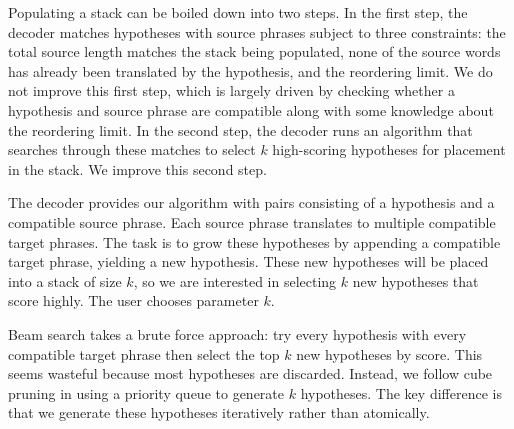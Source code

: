 \documentclass[11pt]{article}
\begin{document}
Populating a stack can be boiled down into two steps.  In the first step, the decoder matches hypotheses with source phrases subject to three constraints: the total source length matches the stack being populated, none of the source words has already been translated by the hypothesis, and the reordering limit.  We do not improve this first step, which is largely driven by checking whether a hypothesis and source phrase are compatible along with some knowledge about the reordering limit.  In the second step, the decoder runs an algorithm that searches through these matches to select $k$ high-scoring hypotheses for placement in the stack.  We improve this second step.   


The decoder provides our algorithm with pairs consisting of a hypothesis and a compatible source phrase.  Each source phrase translates to multiple compatible target phrases.  The task is to grow these hypotheses by appending a compatible target phrase, yielding a new hypothesis.  These new hypotheses will be placed into a stack of size $k$, so we are interested in selecting $k$ new hypotheses that score highly.  The user chooses parameter $k$.

Beam search \cite{beam-speech,pharaoh} takes a brute force approach: try every hypothesis with every compatible target phrase then select the top $k$ new hypotheses by score.  This seems wasteful because most hypotheses are discarded.  Instead, we follow cube pruning \cite{cubepruning} in using a priority queue to generate $k$ hypotheses.  The key difference is that we generate these hypotheses iteratively rather than atomically.  

\end{document}
